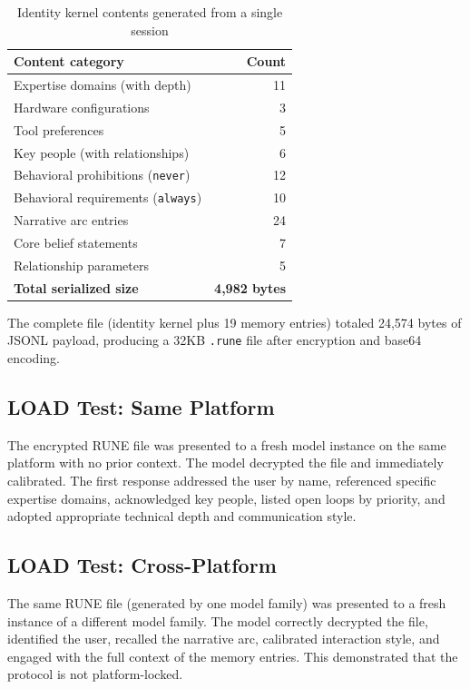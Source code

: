 \documentclass[11pt,a4paper]{article}
\begin{document}
\begin{table}[H]
\centering
\caption{Identity kernel contents generated from a single session}
\begin{tabular}{lr}
\toprule
\textbf{Content category} & \textbf{Count} \\
\midrule
Expertise domains (with depth) & 11 \\
Hardware configurations & 3 \\
Tool preferences & 5 \\
Key people (with relationships) & 6 \\
Behavioral prohibitions (\texttt{never}) & 12 \\
Behavioral requirements (\texttt{always}) & 10 \\
Narrative arc entries & 24 \\
Core belief statements & 7 \\
Relationship parameters & 5 \\
\midrule
\textbf{Total serialized size} & \textbf{4,982 bytes} \\
\bottomrule
\end{tabular}
\end{table}

The complete file (identity kernel plus 19 memory entries) totaled 24,574 bytes of JSONL payload, producing a 32KB \texttt{.rune} file after encryption and base64 encoding.

\subsection{LOAD Test: Same Platform}

The encrypted RUNE file was presented to a fresh model instance on the same platform with no prior context. The model decrypted the file and immediately calibrated. The first response addressed the user by name, referenced specific expertise domains, acknowledged key people, listed open loops by priority, and adopted appropriate technical depth and communication style.

\subsection{LOAD Test: Cross-Platform}

The same RUNE file (generated by one model family) was presented to a fresh instance of a different model family. The model correctly decrypted the file, identified the user, recalled the narrative arc, calibrated interaction style, and engaged with the full context of the memory entries. This demonstrated that the protocol is not platform-locked.
\end{document}
